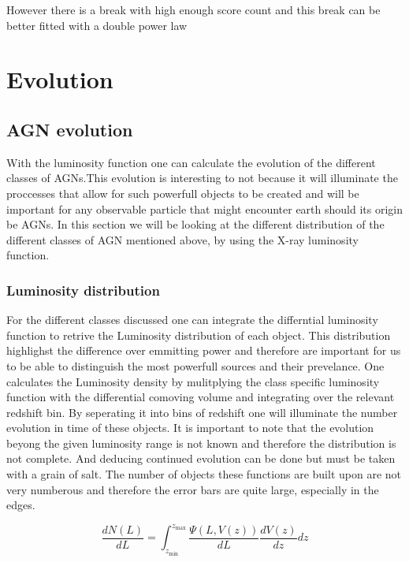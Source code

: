 \documentclass{article}
\begin{document}
However there is a break with high enough score count and this break can be better fitted with a double power law 




\section{Evolution}



\subsection{AGN evolution}
With the luminosity function one can calculate the evolution of the different classes of AGNs.This evolution is interesting to not because it will 
illuminate the proccesses that allow for such powerfull objects to be created and will be important for any observable particle that 
might encounter earth should its origin be AGNs. In this section we will be looking at the different distribution of the different classes of AGN 
mentioned above, by using the X-ray luminosity function. 


\subsubsection{Luminosity distribution}
 
For the different classes discussed one can integrate the differntial luminosity function to retrive the Luminosity distribution of each 
object. This distribution highlighst the difference over emmitting power and therefore are important for us to be able to distinguish the most powerfull 
sources and their prevelance. One calculates the Luminosity density by mulitplying the class specific luminosity
function with the differential comoving volume and integrating over the relevant redshift bin. By seperating it into
bins of redshift one will illuminate the number evolution in time of these objects. It is important to note 
that the evolution beyong the given luminosity range is not known and therefore the distribution is not complete. And deducing continued evolution
can be done but must be taken with a grain of salt. The number of objects these functions are built upon are not very numberous and therefore
the error bars are quite large, especially in the edges. 




\begin{equation}
    \frac{dN(L)}{dL} = \int_{z_{\text{min}}}^{z_{\text{max}}} \frac{\Psi(L, V(z))}{dL} \frac{dV(z)}{dz} dz
\end{equation}
\end{document}
